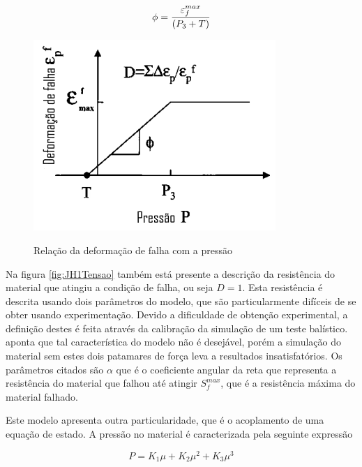 \begin{equation}
    \phi = \frac{\displaystyle \varepsilon^{max}_{f}}{\displaystyle (P_3 + T)}
\end{equation}

\begin{figure}
    \centering  
    \caption{Relação da deformação de falha com a pressão}
    \includegraphics[width = 0.7\linewidth]{images/deffalhapressao.png} 
    \label{fig:deffalhapressJH1}
\end{figure}

Na figura \ref{fig:JH1Tensao} também está presente a descrição da resistência do material que atingiu a condição de falha, ou seja $ D = 1 $. Esta resistência é descrita usando dois parâmetros do modelo, que são particularmente difíceis de se obter usando experimentação. Devido a dificuldade de obtenção experimental, a definição destes é feita através da calibração da simulação de um teste balístico. \cite{holmquist_johnson_2002} aponta que tal característica do modelo não é desejável, porém a simulação do material sem estes dois patamares de força leva a resultados insatisfatórios.
Os parâmetros citados são $ \alpha $ que é o coeficiente angular da reta que representa a resistência do material que falhou até atingir $ S^{max}_f $, que é a resistência máxima do material falhado. \par

Este modelo apresenta outra particularidade, que é o acoplamento de uma  equação de estado. A pressão no material é caracterizada pela seguinte expressão 

\begin{equation} \label{eq:JHEOS}
    P = K_1 \mu + K_2 \mu^2 + K_3 \mu^3
\end{equation}

